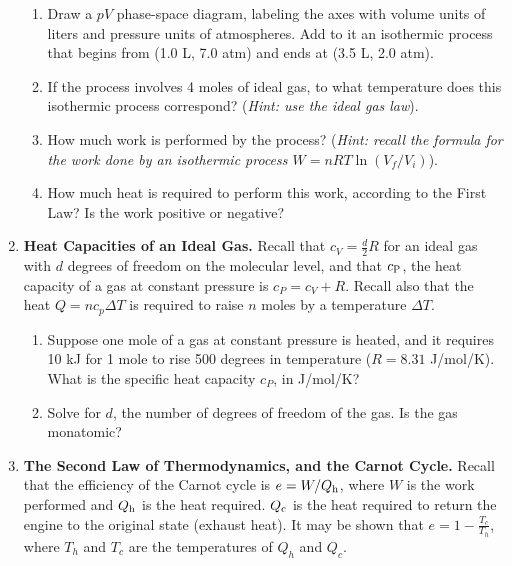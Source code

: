 \documentclass[10pt]{article}
\begin{document}
\begin{enumerate}
\begin{enumerate}
\item Draw a $pV$ phase-space diagram, labeling the axes with volume units of liters and pressure units of atmospheres.  Add to it an isothermic process that begins from (1.0 L, 7.0 atm) and ends at (3.5 L, 2.0 atm). \\ \vspace{3cm}
\item If the process involves 4 moles of ideal gas, to what temperature does this isothermic process correspond?  (\textit{Hint: use the ideal gas law}). \\ \vspace{2cm}
\item How much work is performed by the process?  (\textit{Hint: recall the formula for the work done by an isothermic process $W = nRT\ln(V_f/V_i)$}). \\ \vspace{2cm}
\item How much heat is required to perform this work, according to the First Law? Is the work positive or negative? \\ \vspace{2cm}
\end{enumerate}
\item \textbf{Heat Capacities of an Ideal Gas.} Recall that $c_{V} = \frac{d}{2}R$ for an ideal gas with $d$ degrees of freedom on the molecular level, and that $c_{\rm P}$, the heat capacity of a gas at constant pressure is $c_{P} = c_{V} + R$.  Recall also that the heat $Q = n c_p \Delta T$ is required to raise $n$ moles by a temperature $\Delta T$.
\begin{enumerate}
\item Suppose one mole of a gas at constant pressure is heated, and it requires 10 kJ for 1 mole to rise 500 degrees in temperature ($R = 8.31$ J/mol/K).  What is the specific heat capacity $c_P$, in J/mol/K? \\ \vspace{1cm}
\item Solve for $d$, the number of degrees of freedom of the gas.  Is the gas monatomic? \\ \vspace{1.5cm}
\end{enumerate}
\item \textbf{The Second Law of Thermodynamics, and the Carnot Cycle.}  Recall that the efficiency of the Carnot cycle is $e = W/Q_{\rm h}$, where $W$ is the work performed and $Q_{\rm h}$ is the heat required.  $Q_{\rm c}$ is the heat required to return the engine to the original state (exhaust heat).  It may be shown that $e = 1 - \frac{T_c}{T_h}$, where $T_h$ and $T_c$ are the temperatures of $Q_h$ and $Q_c$.

\end{enumerate}
\end{document}

